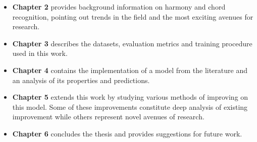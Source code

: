 \begin{itemize}
    \item \textbf{Chapter 2} provides background information on harmony and chord recognition, pointing out trends in the field and the most exciting avenues for research.
    \item \textbf{Chapter 3} describes the datasets, evaluation metrics and training procedure used in this work.
    \item \textbf{Chapter 4} contains the implementation of a model from the literature and an analysis of its properties and predictions. 
    \item \textbf{Chapter 5} extends this work by studying various methods of improving on this model. Some of these improvements constitute deep analysis of existing improvement while others represent novel avenues of research.
    \item \textbf{Chapter 6} concludes the thesis and provides suggestions for future work.
\end{itemize}